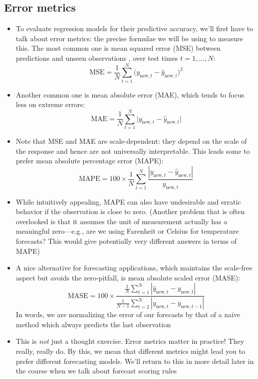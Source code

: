 \documentclass{article}
\begin{document}
\subsection{Error metrics}

\def\MSE{\mathrm{MSE}}
\def\MAE{\mathrm{MAE}}
\def\MAPE{\mathrm{MAPE}}
\def\MASE{\mathrm{MASE}}

\begin{itemize}
\item To evaluate regression models for their predictive accuracy, we'll first
  have to talk about error metrics: the precise formulae we will be using to 
  measure this. The most common one is mean squared error (MSE) between  
  predictions  and unseen observations
  , over test times $t = 1,\dots,N$:
  \[
  \MSE = \frac{1}{N} \sum_{t=1}^N \big( y_{\text{new},t} -
  \hat{y}_{\text{new},t} \big)^2
  \]

\item Another common one is mean absolute error (MAE), which tends to focus less
  on extreme errors: 
  \[
  \MAE = \frac{1}{N} \sum_{t=1}^N \big| y_{\text{new},t} -
  \hat{y}_{\text{new},t} \big|
  \]

\item Note that MSE and MAE are scale-dependent: they depend on the scale of the
  response and hence are not universally interpretable. This leads some to
  prefer mean absolute percentage error (MAPE):
  \[
  \MAPE = 100 \times \frac{1}{N} \sum_{t=1}^N \frac{| y_{\text{new},t} -
    \hat{y}_{\text{new},t}|}{ y_{\text{new},t} } 
  \]

\item While intuitively appealing, MAPE can also have undesirable and erratic
  behavior if the observation  is close to
  zero. (Another problem that is often overlooked is that it assumes the unit
  of measurement actually has a meaningful zero---e.g., are we using Farenheit 
  or Celsius for temperature forecasts? This would give potentially very
  different answers in terms of MAPE) 

\item A nice alternative for forecasting applications, which maintains the
  scale-free aspect but avoids the zero-pitfall, is mean absolute scaled error 
  (MASE):  
  \[
  \MASE = 100 \times \frac{\frac{1}{N} \sum_{t=1}^N | \hat{y}_{\text{new},t} -
    y_{\text{new},t} |}{\frac{1}{N-1} \sum_{t=2}^N | y_{\text{new},t} -
    y_{\text{new},t-1} |}  
  \]
  In words, we are normalizing the error of our forecasts by that of a naive
  method which always predicts the last observation

\item This is \emph{not} just a thought exercise. Error metrics matter in
  practice! They really, really do. By this, we mean that different metrics
  might lead you to prefer different forecasting models. We'll return to this in
  more detail later in the course when we talk about forecast scoring rules
\end{itemize}
\end{document}
